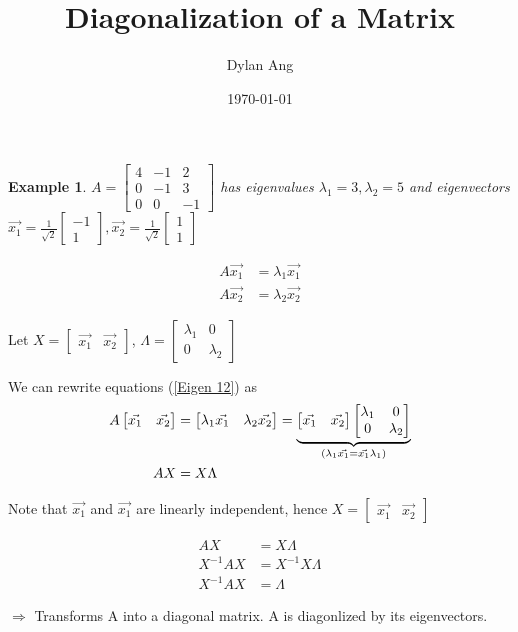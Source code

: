\documentclass[12pt]{amsart}
\title{Diagonalization of a Matrix}
\author{Dylan Ang}
\date{\today}
\newtheorem*{example}{Example}      %
\numberwithin{equation}{theorem}    %
\newcommand{\drawvec}[1]{                    %
    \begin{bmatrix}
        #1
    \end{bmatrix}
}
\begin{document}
\maketitle

\tableofcontents

\begin{example}
    $A = \begin{bmatrix}
            4 & -1 & 2  \\
            0 & -1 & 3  \\
            0 & 0  & -1
        \end{bmatrix}$ has eigenvalues $\lambda_1 = 3, \lambda_2 = 5$ and eigenvectors $\vec{x_1}= \frac{1}{\sqrt{2}} \drawvec{-1 \\ 1}, \vec{x_2}= \frac{1}{\sqrt{2}}\drawvec{1 \\ 1}$
\end{example}

\begin{align} \label{Eigen 12}
    A\vec{x_1} & = \lambda_1\vec{x_1} \\
    A\vec{x_2} & = \lambda_2\vec{x_2}
\end{align}

Let $X=\drawvec{\vec{x_1} & \vec{x_2}}$, $\Lambda = \begin{bmatrix}
        \lambda_1 & 0         \\
        0         & \lambda_2
    \end{bmatrix}$

We can rewrite equations (\ref{Eigen 12}) as
\begin{align*}
    A\drawvec{\vec{x_1} & \vec{x_2}} & = \drawvec{\lambda_1 \vec{x_1} & \lambda_2 \vec{x_2}} = \underbrace{\drawvec{\vec{x_1} & \vec{x_2}} \drawvec{\lambda_1 & 0 \\ 0 & \lambda_2}}_{(\lambda_1\vec{x_1} = \vec{x_1} \lambda_1)}\\
    AX                  & = X\Lambda
\end{align*}

Note that $\vec{x_1}$ and $\vec{x_1}$ are linearly independent, hence $X=\drawvec{\vec{x_1} & \vec{{x_2}}}$

\begin{align*}
    AX        & = X\Lambda         \\
    X^{-1} AX & = X^{-1} X \Lambda \\
    X^{-1}AX  & = \Lambda
\end{align*}

$\Rightarrow$ Transforms A into a diagonal matrix. A is diagonlized by its eigenvectors.
\end{document}
